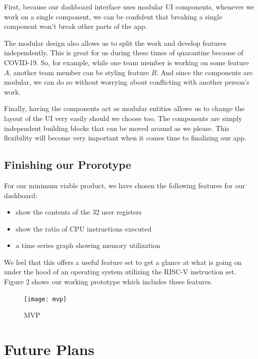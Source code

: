 First, because our dashboard interface uses modular UI components, whenever we work on a single
component, we can be confident that breaking a single component won't break other parts of the app.

The modular design also allows us to split the work and develop features independently. This is great for
us during these times of quarantine because of COVID-19. So, for example, while one team member is working on some feature
$A$, another team member can be styling feature $B$. And since the components are modular, we can do so without
worrying about conflicting with another person's work.

Finally, having the components act as modular entities allows us to change the layout of the UI very easily should
we choose too. The components are simply independent building blocks that can be moved around as we please. This 
flexibility will become very important when it comes time to finalizing our app.

\subsection*{Finishing our Prorotype}

For our minimum viable product, we have chosen the following features for our dashboard:

\begin{itemize}
  \item show the contents of the 32 user registers
  \item show the ratio of CPU instructions executed
  \item a time series graph showing memory utilization
\end{itemize}

We feel that this offers a useful feature set to get a glance at what is going on under the hood
of an operating system utilizing the RISC-V instruction set.
Figure 2 shows our working prototype which includes these features.

\begin{figure}[H]
  \texttt{[image: mvp]}
  \label{fig:mvp}
  \caption{MVP}
  \centering
\end{figure}

\section*{Future Plans}

